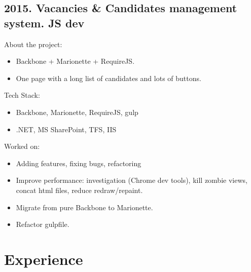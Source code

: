 \documentclass[a4paper, 14pt]{article}
\begin{document}
  \subsection{2015. Vacancies \& Candidates management system. JS dev}
    About the project:
    \begin{itemize}
      \item Backbone + Marionette + RequireJS. \\
      \item One page with a long list of candidates and lots of buttons. \\
    \end{itemize}
    Tech Stack:
    \begin{itemize}
      \item Backbone, Marionette, RequireJS, gulp \\
      \item .NET, MS SharePoint, TFS, IIS \\
    \end{itemize}
    Worked on: 
    \begin{itemize}
      \item Adding features, fixing bugs, refactoring \\
      \item Improve performance: investigation (Chrome dev tools), kill zombie views, concat html files, reduce redraw/repaint.  \\
      \item Migrate from pure Backbone to Marionette. \\
      \item Refactor gulpfile. \\
    \end{itemize}

\section{Experience}
\end{document}
